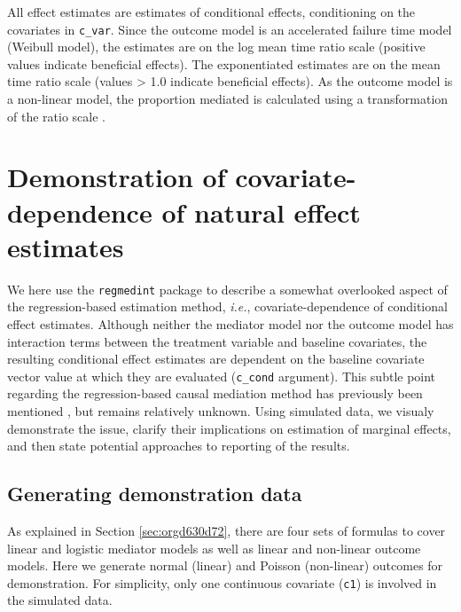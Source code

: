 \documentclass[10pt]{article}
\begin{document}
\normalsize

All effect estimates are estimates of conditional effects, conditioning on the covariates in \texttt{c\_var}. Since the outcome model is an accelerated failure time model (Weibull model), the estimates are on the log mean time ratio scale (positive values indicate beneficial effects). The exponentiated estimates are on the mean time ratio scale (values > 1.0 indicate beneficial effects). As the outcome model is a non-linear model, the proportion mediated is calculated using a transformation of the ratio scale \cite{vanderweeleOddsRatiosMediation2010}.

\section{Demonstration of covariate-dependence of natural effect estimates}
\label{sec:org1a25478}
We here use the \texttt{regmedint} package to describe a somewhat overlooked aspect of the regression-based estimation method, \textit{i.e.}, covariate-dependence of conditional effect estimates. Although neither the mediator model nor the outcome model has interaction terms between the treatment variable and baseline covariates, the resulting conditional effect estimates are dependent on the baseline covariate vector value at which they are evaluated (\texttt{c\_cond} argument). This subtle point regarding the regression-based causal mediation method has previously been mentioned \cite{steenFlexibleMediationAnalysis2017,starkopfComparisonFiveSoftware2017}, but remains relatively unknown. Using simulated data, we visualy demonstrate the issue, clarify their implications on estimation of marginal effects, and then state potential approaches to reporting of the results.

\subsection{Generating demonstration data}
\label{sec:org1df4804}
As explained in Section \ref{sec:orgd630d72}, there are four sets of formulas to cover linear and logistic mediator models as well as linear and non-linear outcome models. Here we generate normal (linear) and Poisson (non-linear) outcomes for demonstration. For simplicity, only one continuous covariate (\texttt{c1}) is involved in the simulated data.
\end{document}

